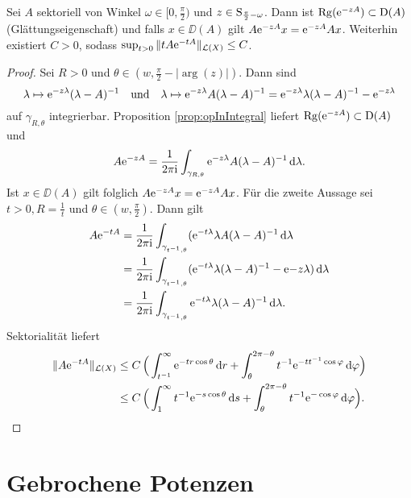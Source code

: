 \begin{thm}
  Sei $A$ sektoriell von Winkel $\omega \in [0,\frac{\pi}{2})$ und $z \in \mathrm{S}_{\frac{\pi}{2} - \omega}$.
    Dann ist $\operatorname{Rg}(\mathrm{e}^{-zA}) \subset \mathrm{D}(A)$ (Glättungseigenschaft) und falls $x \in \DD(A)$ gilt $A \mathrm{e}^{-zA} x = \mathrm{e}^{-z A} A x$.
    Weiterhin existiert $C > 0$, sodass $\sup_{t > 0} \|t A \mathrm{e}^{-t A} \|_{\mathcal{L}(X)} \leq C$.
\end{thm}

\begin{proof}
  Sei $R > 0$ und $\theta \in (w, \frac{\pi}{2} - |\arg(z)|)$.
  Dann sind
  $$
  \lambda \mapsto \mathrm{e}^{-z\lambda}(\lambda - A)^{-1} \quad\text{und}\quad \lambda \mapsto \mathrm{e}^{-z\lambda} A(\lambda - A)^{-1} = \mathrm{e}^{-z\lambda} \lambda (\lambda - A)^{-1} - \mathrm{e}^{-z\lambda} 
  $$
  auf $\gamma_{R,\theta}$ integrierbar.
  Proposition \ref{prop:opInIntegral} liefert $\operatorname{Rg}(\mathrm{e}^{-zA}) \subset \mathrm{D}(A)$ und 
  $$
  A \mathrm{e}^{-zA} = \frac{1}{2\pi \mathrm{i}} \int_{\gamma_{R,\theta}} \mathrm{e}^{-z\lambda} A(\lambda - A)^{-1} \, {\operatorname{d}\!{\lambda}}.
  $$
  Ist $x \in \DD(A)$ gilt folglich $A \mathrm{e}^{-zA} x = \mathrm{e}^{-z A} A x$.
  Für die zweite Aussage sei $t > 0,  R = \frac{1}{t}$ und $\theta \in (w, \frac{\pi}{2})$.
  Dann gilt
  \begin{align*}
    A \mathrm{e}^{-tA}
    &= \frac{1}{2 \pi \mathrm{i}} \int_{\gamma_{t^{-1},\theta}} (\mathrm{e}^{-t\lambda}\lambda A (\lambda - A)^{-1} \, {\operatorname{d}\!{\lambda}} \\
    &= \frac{1}{2 \pi \mathrm{i}} \int_{\gamma_{t^{-1},\theta}} (\mathrm{e}^{-t\lambda} \lambda (\lambda - A)^{-1} - \mathrm{e}{-z\lambda}) \, {\operatorname{d}\!{\lambda}}\\
    &= \frac{1}{2 \pi \mathrm{i}} \int_{\gamma_{t^{-1},\theta}} \mathrm{e}^{-t\lambda} \lambda (\lambda - A)^{-1} \, {\operatorname{d}\!{\lambda}}.
  \end{align*}
  Sektorialität liefert
  \begin{align*}
    \| A \mathrm{e}^{-t A} \|_{\mathcal{L}(X)}
    &\leq C\, \Big( \int_{t^{-1}}^\infty \mathrm{e}^{-tr \cos \theta} \, {\operatorname{d}\!{r}} + \int_\theta^{2\pi - \theta} t^{-1} \mathrm{e}^{-t t^{-1} \cos \varphi} \, {\operatorname{d}\!{\varphi}}\Big) \\
    &\leq C\, \Big( \int_1^\infty t^{-1} \mathrm{e}^{-s\cos \theta} \, {\operatorname{d}\!{s}} + \int_\theta^{2\pi - \theta} t^{-1} \mathrm{e}^{-\cos \varphi} \, {\operatorname{d}\!{\varphi}} \Big). \qedhere
  \end{align*}
\end{proof}

\section{Gebrochene Potenzen}

